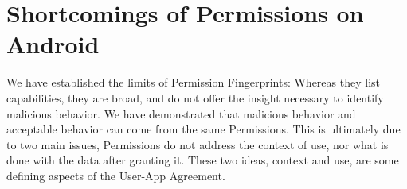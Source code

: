 \section{Shortcomings of Permissions on Android}
We have established the limits of Permission Fingerprints: Whereas they list capabilities, they are broad, and do not offer the insight necessary to identify malicious behavior. We have demonstrated that malicious behavior and acceptable behavior can come from the same Permissions. This is ultimately due to two main issues, Permissions do not address the context of use, nor what is done with the data after granting it. These two ideas, context and use, are some defining aspects of the User-App Agreement.